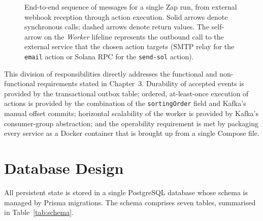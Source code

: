 \begin{figure}[h]
\caption{End-to-end sequence of messages for a single Zap run, from external webhook reception through action execution. Solid arrows denote synchronous calls; dashed arrows denote return values. The self-arrow on the \emph{Worker} lifeline represents the outbound call to the external service that the chosen action targets (SMTP relay for the \texttt{email} action or Solana RPC for the \texttt{send-sol} action).}
\label{fig:webhook-sequence}
\end{figure}

This division of responsibilities directly addresses the functional and non-functional requirements stated in Chapter~3. Durability of accepted events is provided by the transactional outbox table; ordered, at-least-once execution of actions is provided by the combination of the \texttt{sortingOrder} field and Kafka's manual offset commits; horizontal scalability of the worker is provided by Kafka's consumer-group abstraction; and the operability requirement is met by packaging every service as a Docker container that is brought up from a single Compose file.

\section{Database Design}

All persistent state is stored in a single PostgreSQL database whose schema is managed by Prisma migrations. The schema comprises seven tables, summarised in Table~\ref{tab:schema}.

